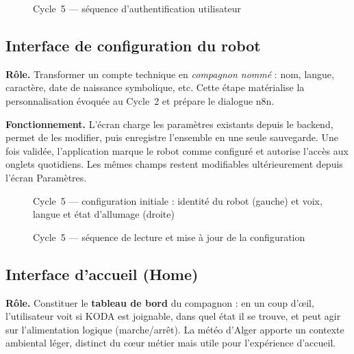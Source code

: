 \documentclass[a4paper,12pt]{report}
\begin{document}
	\begin{figure}[H]
		\centering
		\caption{Cycle~5 --- séquence d'authentification utilisateur}
		\label{fig:ch5-seq-auth}
	\end{figure}
	
	\subsection{Interface de configuration du robot}
	
	\textbf{Rôle.} Transformer un compte technique en \emph{compagnon nommé} :
	nom, langue, caractère, date de naissance symbolique, etc. Cette étape
	matérialise la personnalisation évoquée au Cycle~2 et prépare le dialogue n8n.
	
	\textbf{Fonctionnement.} L'écran charge les paramètres existants depuis le
	backend, permet de les modifier, puis enregistre l'ensemble en une seule
	sauvegarde. Une fois validée, l'application marque le robot comme configuré et
	autorise l'accès aux onglets quotidiens. Les mêmes champs restent modifiables
	ultérieurement depuis l'écran Paramètres.
	
	\begin{figure}[H]
		\centering
		\caption{Cycle~5 --- configuration initiale : identité du robot (gauche) et
			voix, langue et état d'allumage (droite)}
		\label{fig:ch5-ecran-setup}
	\end{figure}
	
	\begin{figure}[H]
		\centering
		\caption{Cycle~5 --- séquence de lecture et mise à jour de la configuration}
		\label{fig:ch5-seq-configuration}
	\end{figure}
	
	\subsection{Interface d'accueil (Home)}
	
	\textbf{Rôle.} Constituer le \textbf{tableau de bord} du compagnon : en un
	coup d'œil, l'utilisateur voit si KODA est joignable, dans quel état il se
	trouve, et peut agir sur l'alimentation logique (marche/arrêt). La météo
	d'Alger apporte un contexte ambiental léger, distinct du cœur métier mais utile
	pour l'expérience d'accueil.
	
\end{document}
